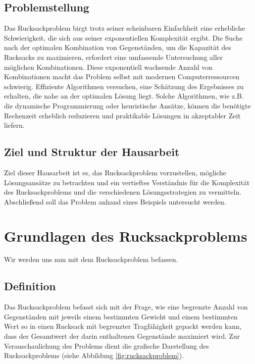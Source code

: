 \documentclass[12pt]{report}
\begin{document}
\section{Problemstellung}
Das Rucksackproblem birgt trotz seiner scheinbaren Einfachheit eine erhebliche Schwierigkeit, die sich aus seiner exponentiellen Komplexität ergibt. Die Suche nach der optimalen Kombination von Gegenständen, um die Kapazität des Rucksacks zu maximieren, erfordert eine umfassende Untersuchung aller möglichen Kombinationen. Diese exponentiell wachsende Anzahl von Kombinationen macht das Problem selbst mit modernen Computerressourcen schwierig. Effiziente Algorithmen versuchen, eine Schätzung des Ergebnisses zu erhalten, die nahe an der optimalen Lösung liegt. Solche Algorithmen, wie z.B. die dynamische Programmierung oder heuristische Ansätze, können die benötigte Rechenzeit erheblich reduzieren und praktikable Lösungen in akzeptabler Zeit liefern.  

\section{Ziel und Struktur der Hausarbeit}
Ziel dieser Hausarbeit ist es, das Rucksackproblem vorzustellen, mögliche Lösungsansätze zu betrachten und ein vertieftes Verständnis für die Komplexität des Rucksackproblems und die verschiedenen Lösungsstrategien zu vermitteln. Abschließend soll das Problem anhand eines Beispiels untersucht werden.

\newpage
\chapter{Grundlagen des Rucksackproblems}
Wir werden uns nun mit dem Rucksackproblem befassen.

\section{Definition}
Das Rucksackproblem befasst sich mit der Frage, wie eine begrenzte Anzahl von Gegenständen mit jeweils einem bestimmten Gewicht und einem bestimmten Wert so in einen Rucksack mit begrenzter Tragfähigkeit gepackt werden kann, dass der Gesamtwert der darin enthaltenen Gegenstände maximiert wird. Zur Veranschaulichung des Problems dient die grafische Darstellung des Rucksackproblems (siehe Abbildung \ref{fig:rucksackproblem}). 
\end{document}
